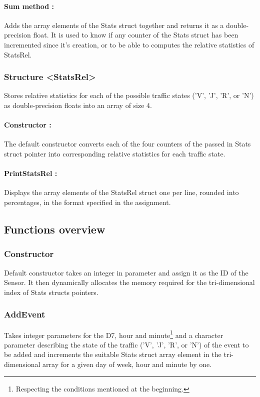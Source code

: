 \documentclass[10pt]{article}
\begin{document}
\paragraph{Sum method :}
Adds the array elements of the Stats struct together and returns it as a double-precision float. It is used to know if any counter of the Stats struct has been incremented since it's creation, or to be able to computes the relative statistics of StatsRel.

\subsubsection*{Structure <StatsRel>}
Stores relative statistics for each of the possible traffic states ('V', 'J', 'R', or 'N') as double-precision floats into an array of size 4.

\paragraph{Constructor :}
The default constructor converts each of the four counters of the passed in Stats struct pointer into corresponding relative statistics for each traffic state.

\paragraph{PrintStatsRel :}
Displays the array elements of the StatsRel struct one per line, rounded into percentages, in the format specified in the assignment.

\subsection{Functions overview}

\subsubsection*{Constructor}
Default constructor takes an integer in parameter and assign it as the ID of the Sensor. It then dynamically allocates the memory required for the tri-dimensional index of Stats structs pointers.

\subsubsection*{AddEvent}
Takes integer parameters for the D7, hour and minute\footnote{ Respecting the conditions mentioned at the beginning.} and a character parameter describing the state of the traffic ('V', 'J', 'R', or 'N') of the event to be added and increments the suitable Stats struct array element in the tri-dimensional array for a given day of week, hour and minute by one.
\end{document}
